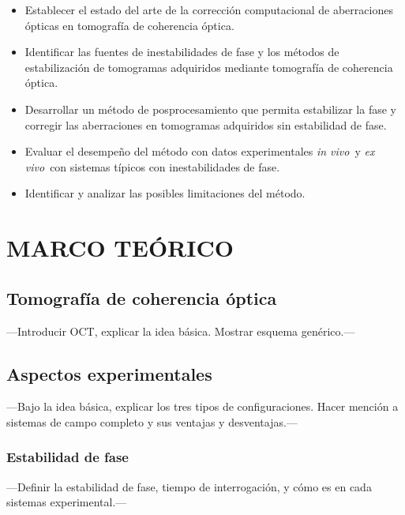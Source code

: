 \documentclass[letter, 12 pt]{article}
\newcommand{\invi}{\textit{in vivo}}
\newcommand{\exvi}{\textit{ex vivo}}
\begin{document}
\begin{itemize}
    
    \item Establecer el estado del arte de la corrección computacional de aberraciones ópticas en tomografía de coherencia óptica.
    
    \item Identificar las fuentes de inestabilidades de fase y los métodos de estabilización de tomogramas adquiridos mediante tomografía de coherencia óptica.
    
    \item Desarrollar un método de posprocesamiento que permita estabilizar la fase y corregir las aberraciones en tomogramas adquiridos sin estabilidad de fase.
    
    \item Evaluar el desempeño del método con datos experimentales \invi\ y \exvi\ con sistemas típicos con inestabilidades de fase.
    
    \item Identificar y analizar las posibles limitaciones del método. \\
    
\end{itemize}



\section{MARCO TEÓRICO}

	\subsection{Tomografía de coherencia óptica}
---Introducir OCT, explicar la idea básica. Mostrar esquema genérico.---

	\subsection{Aspectos experimentales}
---Bajo la idea básica, explicar los tres tipos de configuraciones. Hacer mención a sistemas de campo completo y sus ventajas y desventajas.---

		\subsubsection{Estabilidad de fase}
---Definir la estabilidad de fase, tiempo de interrogación, y cómo es en cada sistemas experimental.---
\end{document}
